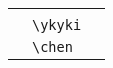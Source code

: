 \documentclass[uplatex, dvipdfmx, 12pt, crop=false]{standalone}
\begin{document}
\begin{table}[htb]
\begin{tabular}{ll@{\qquad}l}
		\tablesubtitle{その他} \\
		\ykyki & \verb|\ykyki| &  \\
		\chen  & \verb|\chen|  &  \\
		\hline

		\hline
	\end{tabular}
\end{table}
\end{document}
